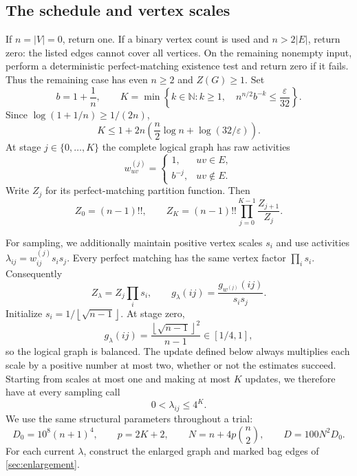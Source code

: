 \documentclass[11pt]{article}
\theoremstyle{definition}
\theoremstyle{remark}
\newcommand{\eps}{\varepsilon}
\newcommand{\floor}[1]{\left\lfloor#1\right\rfloor}
\numberwithin{equation}{section}
\begin{document}
\subsection{The schedule and vertex scales}
If $n=|V|=0$, return one. If a binary vertex count is used and
$n>2|E|$, return zero: the listed edges cannot cover all vertices.
On the remaining nonempty input, perform a deterministic
perfect-matching existence test and return zero if it fails. Thus the
remaining case has even $n\ge2$ and $Z(G)\ge1$.
Set
\begin{equation}\label{eq:schedule}
 b=1+\frac1n,\qquad
 K=\min\left\{k\in\mathbb N:k\ge1,\quad
                    n^{n/2}b^{-k}\le\frac\eps{32}\right\}.
\end{equation}
Since $\log(1+1/n)\ge1/(2n)$,
\begin{equation}\label{eq:schedule-length}
 K\le 1+2n\left(\frac n2\log n+\log(32/\eps)\right).
\end{equation}
At stage $j\in\{0,\ldots,K\}$ the complete logical graph has raw
activities
\[
 w^{(j)}_{uv}=
 \begin{cases}1,&uv\in E,\\ b^{-j},&uv\notin E.\end{cases}
\]
Write $Z_j$ for its perfect-matching partition function. Then
\begin{equation}\label{eq:raw-telescoping}
 Z_0=(n-1)!!,\qquad
 Z_K=(n-1)!!\prod_{j=0}^{K-1}\frac{Z_{j+1}}{Z_j}.
\end{equation}

For sampling, we additionally maintain positive vertex scales $s_i$ and
use activities $\lambda_{ij}=w^{(j)}_{ij}s_i s_j$. Every perfect matching
has the same vertex factor $\prod_i s_i$. Consequently
\begin{equation}\label{eq:scaling-identities}
 Z_\lambda=Z_j\prod_i s_i,
 \qquad
 g_\lambda(ij)=\frac{g_{w^{(j)}}(ij)}{s_i s_j}.
\end{equation}
Initialize $s_i=1/\floor{\sqrt{n-1}}$. At stage zero,
\[
 g_\lambda(ij)=\frac{\floor{\sqrt{n-1}}^2}{n-1}\in[1/4,1],
\]
so the logical graph is balanced. The update defined below always
multiplies each scale by a positive number at most two, whether or not
the estimates succeed. Starting from scales at most one and making at
most $K$ updates, we therefore have at every sampling call
\begin{equation}\label{eq:unconditional-height-bound}
 0<\lambda_{ij}\le4^K.
\end{equation}
We use the same structural parameters throughout a trial:
\begin{equation}\label{eq:counting-structural-parameters}
 D_0=10^8(n+1)^4,\qquad p=2K+2,\qquad
 N=n+4p\binom n2,\qquad D=100N^2D_0.
\end{equation}
For each current $\lambda$, construct the enlarged graph and marked
bag edges of \cref{sec:enlargement}.
\end{document}
